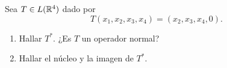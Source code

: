\item Sea $T\in L(\mathbb{R}^4)$ dado por \[T(x_1,x_2,x_3,x_4)=(x_2,x_3,x_4,0).\]
    \begin{enumerate}
        \item Hallar $T^*$. ¿Es $T$ un operador normal?
            \begin{mdframed}[style=s]
                
            \end{mdframed}
        \item Hallar el núcleo y la imagen de $T^*$.
            \begin{mdframed}[style=s]
                
            \end{mdframed}
    \end{enumerate}